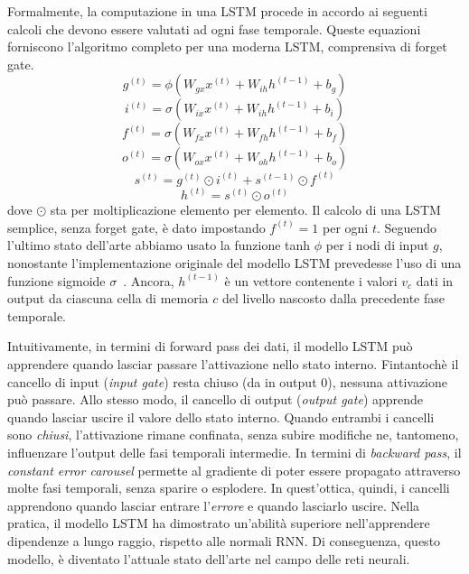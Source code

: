 Formalmente, la computazione in una LSTM procede in accordo ai seguenti calcoli
che devono essere valutati ad ogni fase temporale. Queste equazioni forniscono
l'algoritmo completo per una moderna LSTM, comprensiva di forget gate.
\begin{equation}
  g^{(t)} = \phi(W_{gx}x^{(t)} + W_{ih}h^{(t-1)} + b_g)
\end{equation}
\begin{equation}
  i^{(t)} = \sigma(W_{ix}x^{(t)} + W_{ih}h^{(t-1)} + b_i)
\end{equation}
\begin{equation}
  f^{(t)} = \sigma(W_{fx}x^{(t)} + W_{fh}h^{(t-1)} + b_f)
\end{equation}
\begin{equation}
  o^{(t)} = \sigma(W_{ox}x^{(t)} + W_{oh}h^{(t-1)} + b_o)
\end{equation}
\begin{equation}
  s^{(t)} = g^{(t)} \odot i^{(t)} + s^{(t-1)} \odot f^{(t)}
\end{equation}
\begin{equation}
  h^{(t)} = s^{(t)} \odot o^{(t)}
\end{equation}
dove $\odot$ sta per moltiplicazione elemento per elemento.
Il calcolo di una LSTM semplice, senza forget gate, \`e dato impostando
$f^{(t)} = 1$ per ogni $t$. Seguendo l'ultimo stato dell'arte abbiamo usato la
funzione tanh $\phi$ per i nodi di input $g$, nonostante l'implementazione
originale del modello LSTM prevedesse l'uso di una funzione sigmoide $\sigma$~\cite{Hochreiter:1997}.
Ancora, $h^{(t-1)}$ \`e un vettore contenente i valori $v_c$ dati in output da
ciascuna cella di memoria $c$ del livello nascosto dalla precedente fase temporale.

Intuitivamente, in termini di forward pass dei dati, il modello LSTM pu\`o
apprendere quando lasciar passare l'attivazione nello stato interno. Fintantoch\`e
il cancello di input (\emph{input gate}) resta chiuso (da in output 0), nessuna
attivazione pu\`o passare. Allo stesso modo, il cancello di output (\emph{output
gate}) apprende quando lasciar uscire il valore dello stato interno. Quando
entrambi i cancelli sono \emph{chiusi}, l'attivazione rimane confinata, senza
subire modifiche ne, tantomeno, influenzare l'output delle fasi temporali intermedie.
In termini di \emph{backward pass}, il \emph{constant error carousel} permette al
gradiente di poter essere propagato attraverso molte fasi temporali, senza sparire
o esplodere. In quest'ottica, quindi, i cancelli apprendono quando lasciar entrare
l'\emph{errore} e quando lasciarlo uscire. Nella pratica, il modello LSTM ha
dimostrato un'abilit\`a superiore nell'apprendere dipendenze a lungo raggio,
rispetto alle normali RNN. Di conseguenza, questo modello, \`e diventato
l'attuale stato dell'arte nel campo delle reti neurali.

